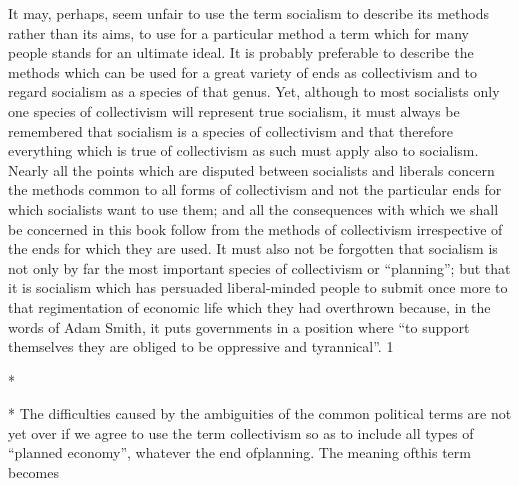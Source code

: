 \documentclass[11pt,openany]{book}
\begin{document}
It may, perhaps, seem unfair to use the term socialism to describe its methods rather than its aims, to use for a particular method a term which for many people stands for an ultimate ideal. It is probably preferable to describe the methods which can be used for a great variety of ends as collectivism and to regard socialism as a species of that genus. Yet, although to most socialists only one species of collectivism will represent true socialism, it must always be remembered that socialism is a species of collectivism and that therefore everything which is true of collectivism as such must apply also to socialism. Nearly all the points which are disputed between socialists and liberals concern the methods common to all forms of collectivism and not the particular ends for which socialists want to use them; and all the consequences with which we shall be concerned in this book follow from the methods of collectivism irrespective of the ends for which they are used. It must also not be forgotten that socialism is not only by far the most important species of collectivism or ``planning''; but that it is socialism which has persuaded liberal-minded people to submit once more to that regimentation of economic life which they had overthrown because, in the words of Adam Smith, it puts governments in a position where ``to support themselves they are obliged to be oppressive and tyrannical''. 1

\begin{center}\textasteriskcentered\hspace{0.9em}\textasteriskcentered\hspace{0.9em}\textasteriskcentered\end{center}

\begin{center}\textasteriskcentered\hspace{0.9em}\textasteriskcentered\hspace{0.9em}\textasteriskcentered\end{center}

\begin{center}\textasteriskcentered\hspace{0.9em}\textasteriskcentered\hspace{0.9em}\textasteriskcentered\end{center}

*

* The difficulties caused by the ambiguities of the common political terms are not yet over if we agree to use the term collectivism so as to include all types of ``planned economy'', whatever the end ofplanning. The meaning ofthis term becomes
\end{document}
